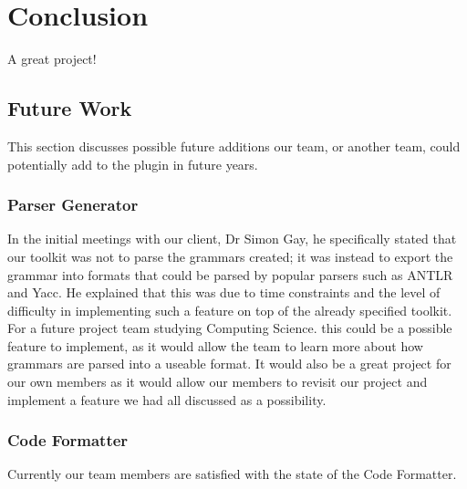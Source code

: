\chapter{Conclusion}

A great project!

\section{Future Work}
This section discusses possible future additions our team, or another team, could potentially add to the plugin in future years. 

\subsection{Parser Generator}
In the initial meetings with our client, Dr Simon Gay, he specifically stated that our toolkit was not to parse the grammars created; it was instead to export the grammar into formats that could be parsed by popular parsers such as ANTLR and Yacc. He explained that this was due to time constraints and the level of difficulty in implementing such a feature on top of the already specified toolkit. For a future project team studying Computing Science. this could be a possible feature to implement, as it would allow the team to learn more about how grammars are parsed into a useable format. It would also be a great project for our own members as it would allow our members to revisit our project and implement a feature we had all discussed as a possibility. 

\subsection{Code Formatter}
Currently our team members are satisfied with the state of the Code Formatter. 
